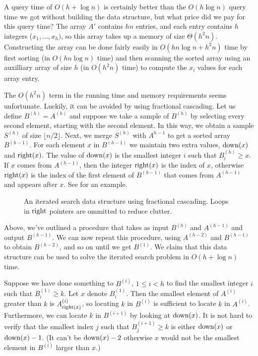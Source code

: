 A query time of $O(h+\log n)$ is certainly better than the $O(h\log
n)$ query time we got without building the data structure, but what
price did we pay for this query time?  The array $A'$ contains $hn$
entries, and each entry contains $h$ integers ($x_1,\ldots,x_h)$, so
this array takes up a memory of size $\Theta(h^2n)$.  Constructing the
array can be done fairly easily in $O(hn\log n+h^2n)$ time by first
sorting (in $O(hn\log n)$ time) and then scanning the sorted array
using an auxilliary array of size $h$ (in $O(h^2n)$ time) to compute
the $x_i$ values for each array entry.

The $O(h^2n)$ term in the running time and memory requirements seems
unfortunate.  Luckily, it can be avoided by using fractional
cascading.  Let us define $B^{(h)}=A^{(h)}$ and suppose we take a
sample of $B^{(h)}$ by selecting every second element, starting with
the second element.  In this way, we obtain a sample $S^{(h)}$ of size
$\lfloor n/2\rfloor$.  Next, we merge $S^{(h)}$ with $A^{h-1}$ to get
a sorted array $B^{(h-1)}$.  For each element $x$ in $B^{(h-1)}$ we
maintain two extra values, $\mathrm{down}(x)$ and $\mathrm{right}(x)$.  The value of
$\mathrm{down}(x)$ is the smallest integer $i$ such that $B^{(h)}_i\ge x$.  If
$x$ comes from $A^{(h-1)}$, then the integer $\mathrm{right}(x)$ is the index
of $x$, otherwise $\mathrm{right}(x)$ is the index of the first element of
$B^{(h-1)}$ that comes from $A^{(h-1)}$ and appears after $x$.  See
 for an example.

\begin{figure}
\caption{An iterated search data structure using fractional cascading.
	Loops in $\mathrm{right}$ pointers are ommitted to reduce clutter.}
\end{figure}

Above, we've outlined a procedure that takes as input $B^{(h)}$ and
$A^{(h-1)}$ and output $B^{(h-1)}$.  We can now repeat this procedure,
using $A^{(h-2)}$ and $B^{(h-1)}$ to obtain $B^{(h-2)}$, and so on
until we get $B^{(1)}$.  We claim that this data structure can be used
to solve the iterated search problem in $O(h+\log n)$ time.

Suppose we have done something to $B^{(i)}$, $1\le i< h$ to find the
smallest integer $i$ such that $B^{(1)}_i\ge k$.  Let $x$ denote
$B^{(1)}_i$.  Then the smallest element of $A^{(i)}$ greater than $k$
is $A^{(i)}_{\mathrm{right}(x)}$, so locating $k$ in $B^{(i)}$ is sufficient to
locate $k$ in $A^{(i)}$.  Furthermore, we can locate $k$ in
$B^{(i+1)}$ by looking at $\mathrm{down}(x)$.  It is not hard to verify that
the smallest index $j$ such that $B^{(i+1)}_j\ge k$ is either $\mathrm{down}(x)$
or $\mathrm{down}(x)-1$.  (It can't be $\mathrm{down}(x)-2$ otherwise $x$ would not be
the smallest element in $B^{(i)}$ larger than $x$.)


